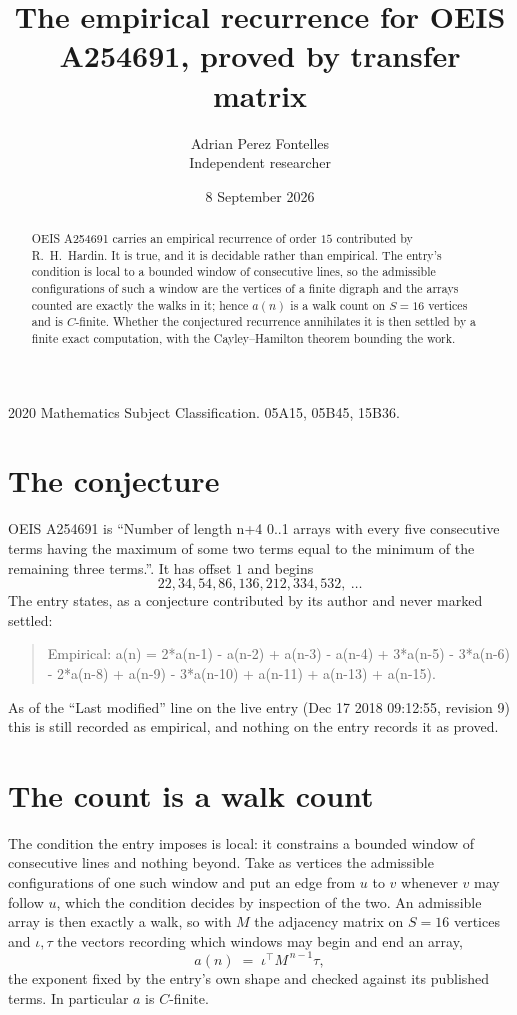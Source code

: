 \documentclass[11pt,a4paper]{article}
\title{The empirical recurrence for OEIS A254691, proved by transfer matrix}
\author{Adrian Perez Fontelles\\ \small Independent researcher}
\date{8 September 2026}
\theoremstyle{plain}
\theoremstyle{definition}
\begin{document}
\maketitle

\begin{abstract}
OEIS A254691 carries an empirical recurrence of order $15$ contributed by R.~H.~Hardin. It is
true, and it is decidable rather than empirical. The entry's condition is local to a bounded window of consecutive lines, so
the admissible configurations of such a window are the vertices of a finite digraph and the
arrays counted are exactly the walks in it; hence $a(n)$ is a walk count on $S=16$ vertices
and is $C$-finite. Whether the conjectured recurrence annihilates it is then settled by a
finite exact computation, with the Cayley--Hamilton theorem bounding the work.
\end{abstract}

\noindent\small 2020 Mathematics Subject Classification. 05A15, 05B45, 15B36.\normalsize

\section{The conjecture}

OEIS A254691 is ``Number of length n+4 0..1 arrays with every five consecutive terms having the maximum of some two terms equal to the minimum of the remaining three terms.''. It has offset $1$ and begins
\[
22, 34, 54, 86, 136, 212, 334, 532,\ \dots
\]
The entry states, as a conjecture contributed by its author and never marked settled:
\begin{quote}
Empirical: a(n) = 2*a(n-1) - a(n-2) + a(n-3) - a(n-4) + 3*a(n-5) - 3*a(n-6) - 2*a(n-8) + a(n-9) - 3*a(n-10) + a(n-11) + a(n-13) + a(n-15).
\end{quote}
As of the ``Last modified'' line on the live entry (Dec 17 2018 09:12:55, revision 9) this is still
recorded as empirical, and nothing on the entry records it as proved.

\section{The count is a walk count}

The condition the entry imposes is local: it constrains a bounded window of consecutive lines and nothing beyond. Take as
vertices the admissible configurations of one such window and put an edge from $u$ to $v$
whenever $v$ may follow $u$, which the condition decides by inspection of the two. An
admissible array is then exactly a walk, so with $M$ the adjacency matrix on $S=16$ vertices
and $\iota,\tau$ the vectors recording which windows may begin and end an array,
\[
a(n)\;=\;\iota^{\!\top}M^{\,n-1}\tau ,
\]
the exponent fixed by the entry's own shape and checked against its published terms. In
particular $a$ is $C$-finite.
\end{document}
